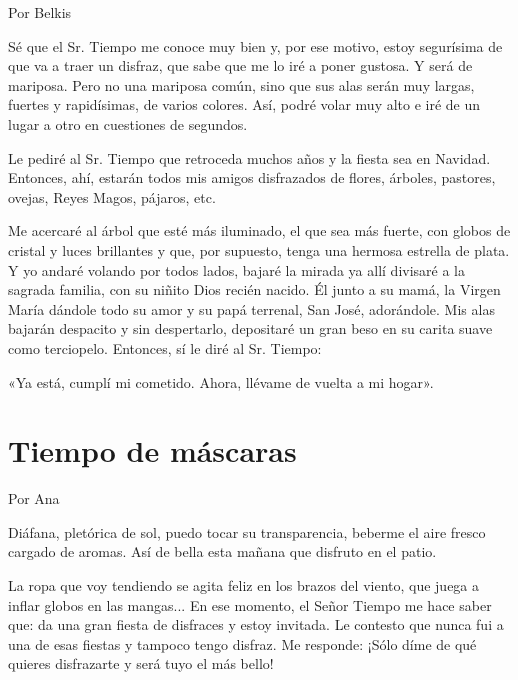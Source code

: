 \documentclass[11pt,twoside,openright,a5paper]{book}
\begin{document}
\begin{flushright}Por Belkis\end{flushright}

Sé que el Sr. Tiempo me conoce muy bien y, por ese motivo, estoy segurísima de que va a traer un disfraz, que sabe que me lo iré a poner gustosa. Y será de mariposa. Pero no una mariposa común, sino que sus alas serán muy largas, fuertes y rapidísimas, de varios colores. Así, podré volar muy alto e iré de un lugar a otro en cuestiones de segundos. 

Le pediré al Sr. Tiempo que retroceda muchos años y la fiesta sea en Navidad. Entonces, ahí, estarán todos mis amigos disfrazados de flores,  árboles, pastores, ovejas, Reyes Magos, pájaros, etc.

Me acercaré al árbol que esté más iluminado, el que sea más fuerte, con globos de cristal y luces brillantes y que, por supuesto, tenga una hermosa estrella de plata. Y yo andaré volando por todos lados, bajaré la mirada ya allí divisaré a la sagrada familia, con su niñito Dios recién nacido. Él junto a su mamá, la Virgen María dándole todo su amor y su papá terrenal, San José, adorándole. Mis alas bajarán despacito y sin despertarlo, depositaré un gran beso en su carita suave como terciopelo. Entonces, sí le diré al Sr. Tiempo: 

«Ya está, cumplí mi cometido. Ahora, llévame de vuelta a mi hogar».

\section*{Tiempo de máscaras}

                                                                                      \begin{flushright}Por Ana\end{flushright}

Diáfana, pletórica de sol, puedo tocar su transparencia, beberme el aire fresco cargado de aromas. Así de bella esta mañana que disfruto en el patio.

La ropa que voy tendiendo se agita feliz en los brazos del viento, que juega a inflar globos en las mangas... En ese momento, el Señor Tiempo me hace saber que: da una gran fiesta de disfraces y estoy invitada. Le contesto que nunca fui a una de esas fiestas y tampoco tengo disfraz. Me responde: ¡Sólo díme de qué quieres disfrazarte y será tuyo el más bello!
\end{document}

